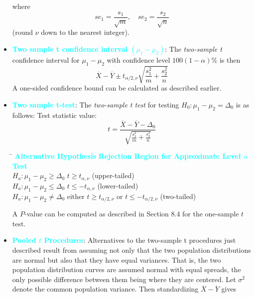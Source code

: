 \documentclass{report}
\begin{document}
\begin{itemize}
\[        \]
        where
        \[
            se_1 = \frac{s_1}{\sqrt{m}}, \quad se_2 = \frac{s_2}{\sqrt{n}}
        \]
        (round $\nu$ down to the nearest integer).
    \item \textbf{\textcolor{cyan}{Two sample t confidence interval $(\mu_{1} - \mu_{2})$}}:
        The \textit{two-sample t} confidence interval for $\mu_1 - \mu_2$ with confidence level $100(1 - \alpha)\%$ is then
        \[
            \overline{X} - \overline{Y} \pm t_{\alpha/2, \nu} \sqrt{\frac{s_1^2}{m} + \frac{s_2^2}{n}}
        \]
        A one-sided confidence bound can be calculated as described earlier.
    \item \textbf{\textcolor{cyan}{Two sample t-test}}:
        The \textit{two-sample t test} for testing $H_0: \mu_1 - \mu_2 = \Delta_0$ is as follows:
        \bigbreak \noindent 
        Test statistic value:
        \[
            t = \frac{\overline{X} - \overline{Y} - \Delta_0}{\sqrt{\frac{s_1^2}{m} + \frac{s_2^2}{n}}}
        \]
        \bigbreak \noindent 
        \begin{tabbing}
            \hspace{3cm} \= \kill
            \textcolor{cyan}{\textbf{Alternative Hypothesis}} \> \textcolor{cyan}{\textbf{Rejection Region for Approximate Level $\alpha$ Test}} \\
            $H_a: \mu_1 - \mu_2 \geq \Delta_0$ \> $t \ge t_{\alpha, \nu}$ (upper-tailed) \\
            $H_a: \mu_1 - \mu_2 \leq \Delta_0$ \> $t \le -t_{\alpha, \nu}$ (lower-tailed) \\
            $H_a: \mu_1 - \mu_2 \neq \Delta_0$ \> either $t \ge t_{\alpha/2, \nu}$ or $t \le -t_{\alpha/2, \nu}$ (two-tailed) \\
        \end{tabbing}
        \bigbreak \noindent 
        A $P$-value can be computed as described in Section 8.4 for the one-sample $t$ test.
    \item \textbf{\textcolor{cyan}{Pooled $t$ Procedures}}:
        Alternatives to the two-sample t procedures just described result from assuming not
        only that the two population distributions are normal but also that they have equal
        variances. That is, the two population distribution curves are assumed
        normal with equal spreads, the only possible difference between them being where
        they are centered.
        \bigbreak \noindent 
        Let $\sigma^2$ denote the common population variance. Then standardizing $\overline{X} - \overline{Y}$ gives

\end{itemize}
\end{document}
